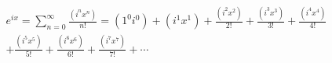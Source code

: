 \documentclass[preview]{standalone}
\begin{document}
\begin{align*}
e^{ix} = \sum_{n=0}^{\infty} \frac{(i^nx^n)}{n!} = (1^0i^0) + (i^1x^1) + \frac{(i^2x^2)}{2!} + \frac{(i^3x^3)}{3!} + \frac{(i^4x^4)}{4!} \\ + \frac{(i^5x^5)}{5!}+ \frac{(i^6x^6)}{6!} + \frac{(i^7x^7)}{7!} + \cdots
\end{align*}
\end{document}

